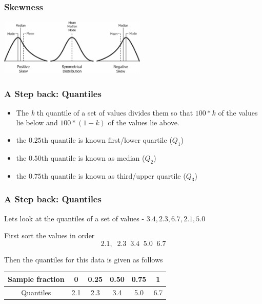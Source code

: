 \documentclass{beamer}\usepackage[]{graphicx}\usepackage[]{color}
\begin{document}
\begin{frame}
\frametitle{Skewness}
\begin{center}
\includegraphics[width=7cm,keepaspectratio]{skewness.jpg} 
\end{center}
\end{frame}

\begin{frame}[fragile]
\frametitle{A Step back: Quantiles}

\begin{itemize}
\item The \emph{k} th quantile of a set of values divides them so that $100*k$  
of the values lie below and $100*(1-k)$ of the values lie above. \pause \newline

\item the $0.25$th quantile is known first/lower quartile ($Q_1$)  \pause \newline

\item the $0.50$th quantile is known as median ($Q_2$) \pause \newline

\item the $0.75$th quantile is known as third/upper quartile ($Q_3$) \pause \newline

\end{itemize}
\end{frame}


\begin{frame}[fragile]
\frametitle{A Step back: Quantiles}

Lets look at the quantiles of a set of values - $3.4, 2.3, 6.7, 2.1, 5.0$ \pause \newline

First sort the values in order
$$ 2.1, \; \; 2.3 \; \; 3.4 \;\; 5.0 \;\; 6.7 $$

Then the quantiles for this data is given as follows 

\begin{tabular}{|c|c|c|c|c|c|}
\hline
Sample fraction & 0 & 0.25 & 0.50 & 0.75 & 1 \\ \hline
Quantiles & 2.1 & 2.3 & 3.4 & 5.0 & 6.7 \\ \hline
\end{tabular}
\end{frame}
\end{document}
